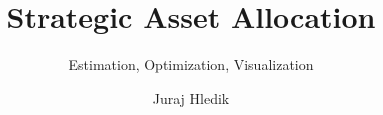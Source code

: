 \documentclass{layout/layout}%
\newcommand\ReportYear{2021}%
\newcommand\ReportMonthName{March}%
\begin{document}
%
\normalsize%
\frontmatter%
\title{Strategic Asset Allocation}%
\subtitle{Estimation, Optimization, Visualization}%
\author{Juraj Hledik}%
\subject{\ReportMonthName \  \ReportYear}%
%
%
\makecover%
%
\tableofcontents%
\listoffigures%
\listoftables%
\mainmatter%
%
%
%



\appendix%
\end{document}
